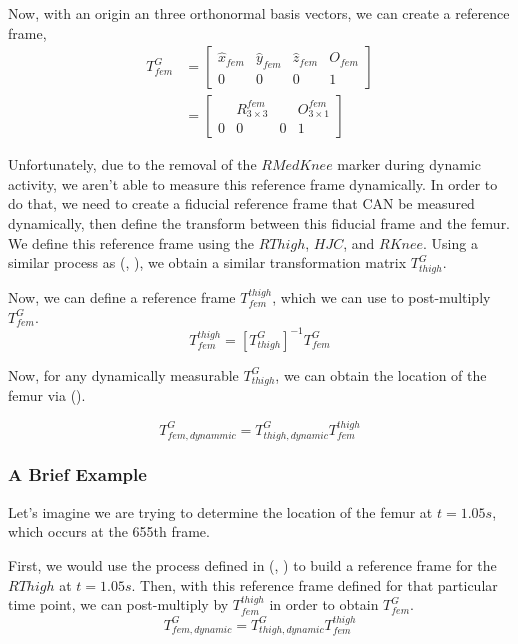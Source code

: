 \documentclass{article}
\begin{document}
    Now, with an origin an three orthonormal basis vectors, we can create a reference frame,
    \begin{equation}
        \begin{aligned}
            T^{G}_{fem} &= \begin{bmatrix}
                \hat{x}_{fem} &\hat{y}_{fem} &\hat{z}_{fem} & O_{fem} \\
                0 & 0 & 0 & 1
            \end{bmatrix} \\
            &= \begin{bmatrix}
                & R^{fem}_{3 \times 3} & & O^{fem}_{3 \times 1} \\
                0 & 0 & 0 & 1
            \end{bmatrix}
        \end{aligned}
        \label{t_gf}
    \end{equation}

    Unfortunately, due to the removal of the $RMedKnee$ marker during dynamic activity, we aren't able to measure this reference frame dynamically. In order to do that, we need to create a fiducial reference frame that CAN be measured dynamically, then define the transform between this fiducial frame and the femur. We define this reference frame using the $RThigh$, $HJC$, and $RKnee$.
    Using a similar process as (, ), we obtain a similar transformation matrix $T^{G}_{thigh}$. 

    Now, we can define a reference frame $T^{thigh}_{fem}$, which we can use to post-multiply $T^{G}_{fem}$. 
    \begin{equation}
        T^{thigh}_{fem} = [T^{G}_{thigh}]^{-1}T^{G}_{fem}
    \end{equation}

    Now, for any dynamically measurable $T^{G}_{thigh}$, we can obtain the location of the femur via ().

    \begin{equation}
        T^{G}_{fem,dynammic} = T^{G}_{thigh,dynamic}T^{thigh}_{fem}
        \label{t_th_g_f}
    \end{equation}

    \begin{mdframed}
        \subsubsection*{A Brief Example}
        Let's imagine we are trying to determine the location of the femur at $t=1.05s$, which occurs at the 655th frame. 
        
        First, we would use the process defined in (, ) to build a reference frame for the $RThigh$ at $t = 1.05s$. Then, with this reference frame defined for that particular time point, we can post-multiply by $T^{thigh}_{fem}$ in order to obtain $T^{G}_{fem}$.
        \begin{equation}
            T^{G}_{fem,dynamic} = T^{G}_{thigh,dynamic}T^{thigh}_{fem}
        \end{equation}
    \end{mdframed}
\end{document}
